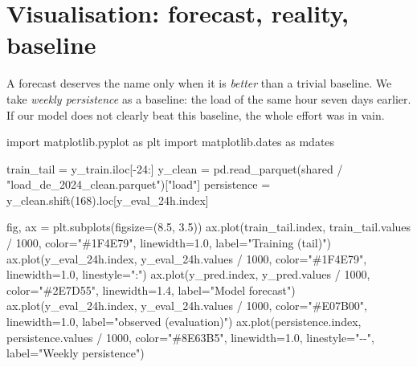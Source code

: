 \documentclass[
  english,
  letterpaper,
]{scrbook}
\newenvironment{Shaded}{\begin{snugshade}}{\end{snugshade}}
\newcommand{\DecValTok}[1]{\textcolor[rgb]{0.68,0.00,0.00}{#1}}
\newcommand{\FloatTok}[1]{\textcolor[rgb]{0.68,0.00,0.00}{#1}}
\newcommand{\ImportTok}[1]{\textcolor[rgb]{0.00,0.46,0.62}{#1}}
\newcommand{\NormalTok}[1]{\textcolor[rgb]{0.00,0.23,0.31}{#1}}
\newcommand{\OperatorTok}[1]{\textcolor[rgb]{0.37,0.37,0.37}{#1}}
\newcommand{\StringTok}[1]{\textcolor[rgb]{0.13,0.47,0.30}{#1}}
\begin{document}
\section{Visualisation: forecast, reality,
baseline}\label{visualisation-forecast-reality-baseline}

A forecast deserves the name only when it is \emph{better} than a
trivial baseline. We take \emph{weekly persistence} as a baseline: the
load of the same hour seven days earlier. If our model does not clearly
beat this baseline, the whole effort was in vain.

\begin{Shaded}
\begin{Highlighting}[]
\ImportTok{import}\NormalTok{ matplotlib.pyplot }\ImportTok{as}\NormalTok{ plt}
\ImportTok{import}\NormalTok{ matplotlib.dates }\ImportTok{as}\NormalTok{ mdates}

\NormalTok{train\_tail }\OperatorTok{=}\NormalTok{ y\_train.iloc[}\OperatorTok{{-}}\DecValTok{24}\NormalTok{:]}
\NormalTok{y\_clean }\OperatorTok{=}\NormalTok{ pd.read\_parquet(shared }\OperatorTok{/} \StringTok{"load\_de\_2024\_clean.parquet"}\NormalTok{)[}\StringTok{"load"}\NormalTok{]}
\NormalTok{persistence }\OperatorTok{=}\NormalTok{ y\_clean.shift(}\DecValTok{168}\NormalTok{).loc[y\_eval\_24h.index]}

\NormalTok{fig, ax }\OperatorTok{=}\NormalTok{ plt.subplots(figsize}\OperatorTok{=}\NormalTok{(}\FloatTok{8.5}\NormalTok{, }\FloatTok{3.5}\NormalTok{))}
\NormalTok{ax.plot(train\_tail.index, train\_tail.values }\OperatorTok{/} \DecValTok{1000}\NormalTok{,}
\NormalTok{        color}\OperatorTok{=}\StringTok{"\#1F4E79"}\NormalTok{, linewidth}\OperatorTok{=}\FloatTok{1.0}\NormalTok{, label}\OperatorTok{=}\StringTok{"Training (tail)"}\NormalTok{)}
\NormalTok{ax.plot(y\_eval\_24h.index, y\_eval\_24h.values }\OperatorTok{/} \DecValTok{1000}\NormalTok{,}
\NormalTok{        color}\OperatorTok{=}\StringTok{"\#1F4E79"}\NormalTok{, linewidth}\OperatorTok{=}\FloatTok{1.0}\NormalTok{, linestyle}\OperatorTok{=}\StringTok{":"}\NormalTok{)}
\NormalTok{ax.plot(y\_pred.index, y\_pred.values }\OperatorTok{/} \DecValTok{1000}\NormalTok{,}
\NormalTok{        color}\OperatorTok{=}\StringTok{"\#2E7D55"}\NormalTok{, linewidth}\OperatorTok{=}\FloatTok{1.4}\NormalTok{, label}\OperatorTok{=}\StringTok{"Model forecast"}\NormalTok{)}
\NormalTok{ax.plot(y\_eval\_24h.index, y\_eval\_24h.values }\OperatorTok{/} \DecValTok{1000}\NormalTok{,}
\NormalTok{        color}\OperatorTok{=}\StringTok{"\#E07B00"}\NormalTok{, linewidth}\OperatorTok{=}\FloatTok{1.0}\NormalTok{, label}\OperatorTok{=}\StringTok{"observed (evaluation)"}\NormalTok{)}
\NormalTok{ax.plot(persistence.index, persistence.values }\OperatorTok{/} \DecValTok{1000}\NormalTok{,}
\NormalTok{        color}\OperatorTok{=}\StringTok{"\#8E63B5"}\NormalTok{, linewidth}\OperatorTok{=}\FloatTok{1.0}\NormalTok{, linestyle}\OperatorTok{=}\StringTok{"{-}{-}"}\NormalTok{, label}\OperatorTok{=}\StringTok{"Weekly persistence"}\NormalTok{)}


\end{Highlighting}
\end{Shaded}
\end{document}
